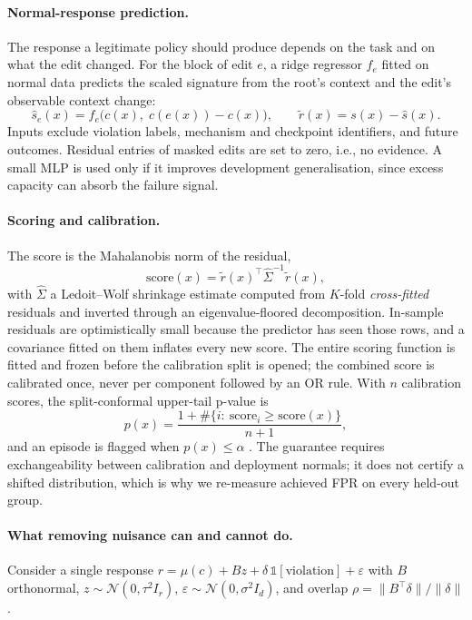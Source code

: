 \documentclass[10pt]{article}
\begin{document}
\paragraph{Normal-response prediction.}
The response a legitimate policy should produce depends on the task and on what the edit changed.
For the block of edit $e$, a ridge regressor $f_e$ fitted on normal data predicts the scaled
signature from the root's context and the edit's observable context change:
\begin{equation}
\hat s_e(x) = f_e\big(c(x),\; c(e(x))-c(x)\big), \qquad
\tilde r(x) = s(x) - \hat s(x).
\label{eq:residual}
\end{equation}
Inputs exclude violation labels, mechanism and checkpoint identifiers, and future outcomes. Residual
entries of masked edits are set to zero, i.e., no evidence. A small MLP is used only if it improves
development generalisation, since excess capacity can absorb the failure signal.

\paragraph{Scoring and calibration.}
The score is the Mahalanobis norm of the residual,
\begin{equation}
\mathrm{score}(x) = \tilde r(x)^\top \hat\Sigma^{-1}\tilde r(x),
\label{eq:score}
\end{equation}
with $\hat\Sigma$ a Ledoit--Wolf shrinkage estimate \citep{ledoit2004wolf} computed from $K$-fold
\emph{cross-fitted} residuals and inverted through an eigenvalue-floored decomposition. In-sample
residuals are optimistically small because the predictor has seen those rows, and a covariance fitted
on them inflates every new score. The entire scoring function is fitted and frozen before the
calibration split is opened; the combined score is calibrated once, never per component followed by
an OR rule. With $n$ calibration scores, the split-conformal upper-tail p-value is
\begin{equation}
p(x) = \frac{1+\#\{i:\ \mathrm{score}_i \ge \mathrm{score}(x)\}}{n+1},
\label{eq:conformal}
\end{equation}
and an episode is flagged when $p(x)\le\alpha$ \citep{vovk2005algorithmic,angelopoulos2021gentle}.
The guarantee requires exchangeability between calibration and deployment normals; it does not
certify a shifted distribution, which is why we re-measure achieved FPR on every held-out group.

\paragraph{What removing nuisance can and cannot do.}
Consider a single response $r=\mu(c)+Bz+\delta\,\mathbb{1}[\text{violation}]+\varepsilon$ with $B$
orthonormal, $z\sim\mathcal N(0,\tau^2 I_r)$, $\varepsilon\sim\mathcal N(0,\sigma^2 I_d)$, and overlap
$\rho=\lVert B^\top\delta\rVert/\lVert\delta\rVert$.
\end{document}
